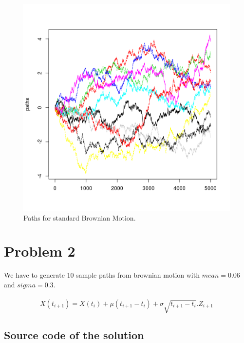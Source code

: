 \documentclass{article}
\begin{document}
			\begin{figure}[!ht]
  			\includegraphics[width=\linewidth]{pic/que1_single.png}
 			 \caption{Paths for standard Brownian Motion.}
  			\label{fig:hist1_1}
		\end{figure}
		
		\clearpage
	
		
	
	\section{Problem 2}
	\paragraph{}
		We have to generate 10 sample paths from brownian motion with $mean=0.06$ and $sigma=0.3$.
		
	\paragraph{}
	\[X(t_{i+1}) = X(t_i)+\mu(t_{i+1}-t_{i})+\sigma\sqrt{t_{i+1}-t_i}.Z_{i+1}\]
		
	\subsection{Source code of the solution}
		
		
\end{document}
